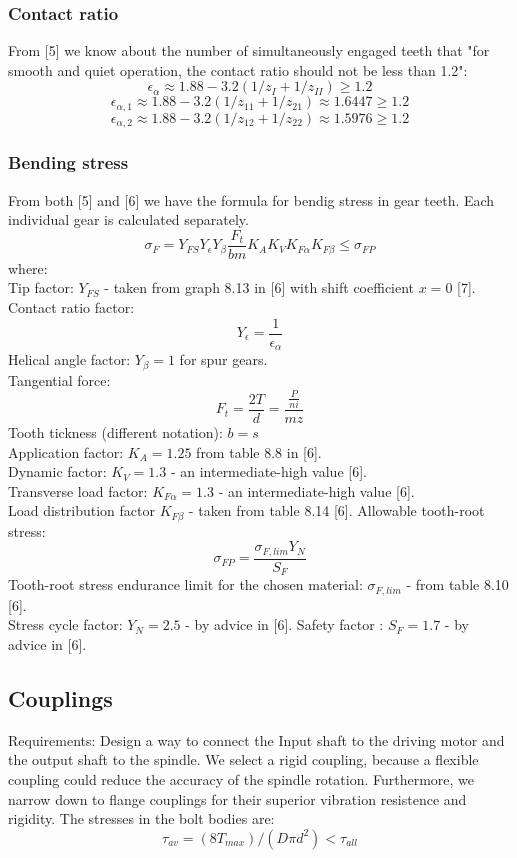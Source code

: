 \documentclass{article}
\begin{document}
\subsubsection{Contact ratio}
From [5] we know about the number of simultaneously engaged teeth that "for smooth and quiet operation, the contact ratio should not be less than 1.2":
$$ \epsilon_\alpha \approx 1.88 - 3.2 (1 / z_I + 1 / z_{II}) \geq 1.2 $$
$$ \epsilon_{\alpha, 1} \approx 1.88 - 3.2 (1 / z_{11} + 1 / z_{21}) \approx 1.6447 \geq 1.2 $$
$$ \epsilon_{\alpha, 2} \approx 1.88 - 3.2 (1 / z_{12} + 1 / z_{22}) \approx 1.5976 \geq 1.2 $$
\subsubsection{Bending stress}
From both [5] and [6] we have the formula for bendig stress in gear teeth.
Each individual gear is calculated separately.
$$ \sigma_F = Y_{FS} Y_\epsilon Y_\beta \frac{F_t}{b m} K_A K_V K_{F\alpha} K_{F\beta} \leq \sigma_{FP} $$
where: \\
Tip factor: $Y_{FS}$ - taken from graph 8.13 in [6] with shift coefficient $x = 0$ [7]. \\
Contact ratio factor: $$Y_\epsilon = \frac{1}{\epsilon_\alpha}$$
Helical angle factor: $Y_\beta = 1$ for spur gears. \\
Tangential force: $$F_t = \frac{2 T}{d} = \frac{\frac{P}{n i}}{m z}$$
Tooth tickness (different notation): $b = s$ \\
Application factor: $K_A = 1.25$ from table 8.8 in [6]. \\
Dynamic factor: $K_V = 1.3$ - an intermediate-high value [6]. \\
Transverse load factor: $K_{F\alpha} = 1.3$ - an intermediate-high value [6]. \\
Load distribution factor $K_{F\beta}$ - taken from table 8.14 [6].
Allowable tooth-root stress: $$\sigma_{FP} = \frac{\sigma_{F, lim} Y_N}{S_F}$$
Tooth-root stress endurance limit for the chosen material: $\sigma_{F, lim}$ - from table 8.10 [6]. \\
Stress cycle factor: $Y_N = 2.5$ - by advice in [6].
Safety factor : $S_F = 1.7$ - by advice in [6].

\subsection{Couplings}
Requirements: Design a way to connect the Input shaft to the driving motor and the output shaft to the spindle.
We select a rigid coupling, because a flexible coupling could reduce the accuracy of the spindle rotation.
Furthermore, we narrow down to flange couplings for their superior vibration resistence and rigidity.
The stresses in the bolt bodies are:
$$\tau_{av} = (8 T_{max}) / (D \pi d^2) < \tau_{all}$$  %
\end{document}
